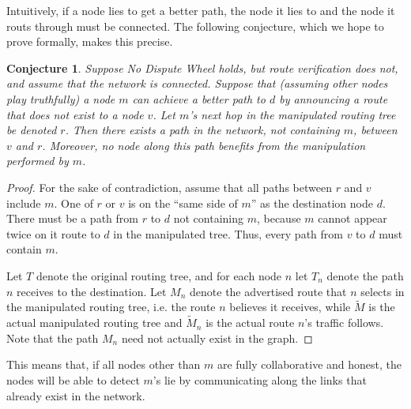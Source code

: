 \documentclass[12pt]{article}
\newtheorem{conjecture}{Conjecture}
\begin{document}
  Intuitively, if a node lies to get a better path, the node it lies
  to and the node it routs through must be connected.
  The following conjecture, which we hope to prove formally,
  makes this precise.
  \begin{conjecture}
    Suppose No Dispute Wheel holds, but route verification does not, and
    assume that the network is connected.
    Suppose that (assuming other nodes play truthfully)
    a node $m$ can achieve a better path to $d$ by announcing
    a route that does not exist to a node $v$.
    Let $m$'s next hop in the manipulated routing tree be denoted $r$.
    Then there exists a path in the network, not containing $m$,
    between $v$ and $r$.
    Moreover, no node along this path benefits from the manipulation
    performed by $m$.
  \end{conjecture}
  \begin{proof}
    For the sake of contradiction, assume that all paths between $r$
    and $v$ include $m$.
    One of $r$ or $v$ is on the ``same side of $m$'' as the destination
    node $d$.
    There must be a path from $r$ to $d$ not containing $m$,
    because $m$ cannot appear twice on it route to $d$ in the manipulated tree.
    Thus, every path from $v$ to $d$ must contain $m$.

    Let $T$ denote the original routing tree, and for each node $n$
    let $T_n$ denote the path $n$ receives to the destination.
    Let $M_n$ denote the advertised route that $n$ selects in the manipulated
    routing tree, i.e. the route $n$ believes it receives,
    while $\widetilde M$ is the actual manipulated routing tree and 
    $\widetilde M_n$ is the actual route $n$'s traffic follows.
    Note that the path $M_n$ need not actually exist in the graph.
  \end{proof}

  This means that, if all nodes other than $m$ are fully collaborative and
  honest, the nodes will be able to detect $m$'s lie
  by communicating along the links that already exist in the network.


{}

\end{document}
